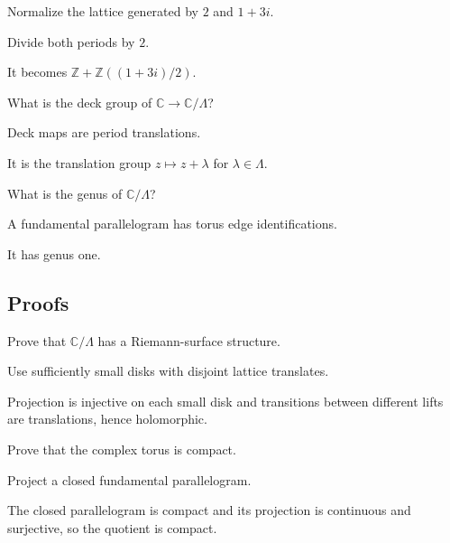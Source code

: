 \begin{exercise}\label{exr:iv27-expand-03}
Normalize the lattice generated by \(2\) and \(1+3i\).
\end{exercise}
\begin{hint}
Divide both periods by \(2\).
\end{hint}
\begin{solution}
It becomes \(\mathbb Z+\mathbb Z((1+3i)/2)\).
\end{solution}

\begin{exercise}\label{exr:iv27-expand-04}
What is the deck group of \(\mathbb C\to\mathbb C/\Lambda\)?
\end{exercise}
\begin{hint}
Deck maps are period translations.
\end{hint}
\begin{solution}
It is the translation group \(z\mapsto z+\lambda\) for \(\lambda\in\Lambda\).
\end{solution}

\begin{exercise}\label{exr:iv27-expand-05}
What is the genus of \(\mathbb C/\Lambda\)?
\end{exercise}
\begin{hint}
A fundamental parallelogram has torus edge identifications.
\end{hint}
\begin{solution}
It has genus one.
\end{solution}

\subsection*{Proofs}

\begin{exercise}\label{exr:iv27-expand-06}
Prove that \(\mathbb C/\Lambda\) has a Riemann-surface structure.
\end{exercise}
\begin{hint}
Use sufficiently small disks with disjoint lattice translates.
\end{hint}
\begin{solution}
Projection is injective on each small disk and transitions between different lifts are translations, hence holomorphic.
\end{solution}

\begin{exercise}[Compactness]\label{exr:iv27-expand-07}
Prove that the complex torus is compact.
\end{exercise}
\begin{hint}
Project a closed fundamental parallelogram.
\end{hint}
\begin{solution}
The closed parallelogram is compact and its projection is continuous and surjective, so the quotient is compact.
\end{solution}


